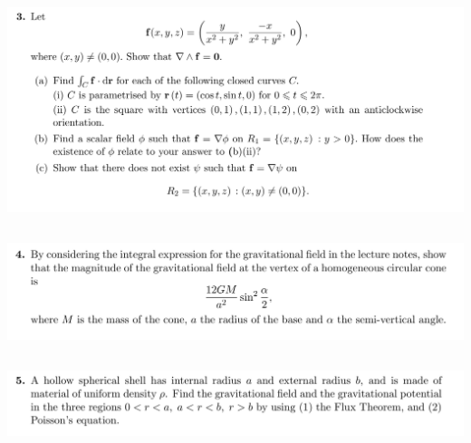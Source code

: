 \subsection{}
\begin{mdframed}
  \includegraphics[width=400pt]{img/oxford-prelims-M5-multivariable-calc-8-3.png}
\end{mdframed}

\subsection{}
\begin{mdframed}
  \includegraphics[width=400pt]{img/oxford-prelims-M5-multivariable-calc-8-4.png}
\end{mdframed}

\subsection{}
\begin{mdframed}
  \includegraphics[width=400pt]{img/oxford-prelims-M5-multivariable-calc-8-5.png}
\end{mdframed}
